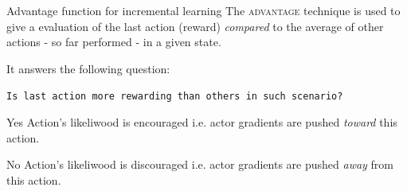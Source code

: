 \documentclass[10pt]{beamer}
\begin{document}
\begin{frame}{Advantage function for incremental learning}
	The \textsc{advantage} technique is used to give a  evaluation of the last action (reward) \textit{compared} to the average of other actions - so far performed - in a given state.
\pause

It answers the following question:	

	\centering
	\texttt{Is last action more rewarding than others in such scenario?}
\pause
	\begin{alertblock}{Yes}
		Action's likeliwood is encouraged i.e. actor gradients are pushed \textit{toward} this action.
	\end{alertblock}
	\begin{alertblock}{No}
		Action's likeliwood is discouraged i.e. actor gradients are pushed \textit{away} from this action. 
	\end{alertblock}
\end{frame}
\end{document}
